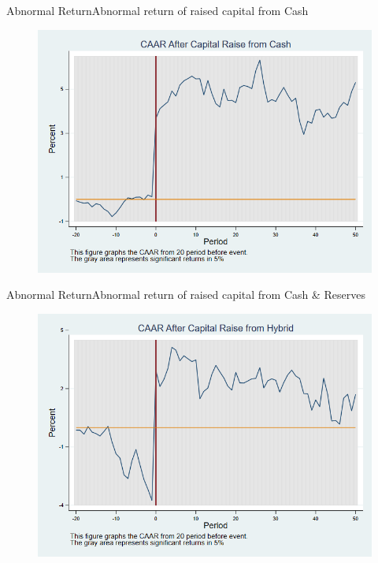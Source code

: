 \documentclass{beamer}
\begin{document}
\begin{frame}{Abnormal Return}{Abnormal return of raised capital from Cash}
	\label{car_marketmodel_industryCash}
	\begin{figure}
		\centering
		\includegraphics[width=0.65\linewidth]{Output/car_marketmodel_industryCash.png}
		\label{fig:car_marketmodel_industryCash}
	\end{figure}
	
\end{frame}

\begin{frame}{Abnormal Return}{Abnormal return of raised capital from Cash \& Reserves}
	\label{car_marketmodel_industryHybrid}
	\begin{figure}
		\centering
		\includegraphics[width=0.65\linewidth]{Output/car_marketmodel_industryHybrid.png}
		\label{fig:car_marketmodel_industryHybrid}
	\end{figure}
\end{frame}
\end{document}
